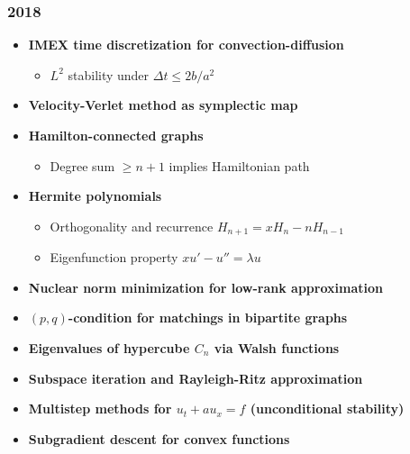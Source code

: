 \subsubsection*{2018}
\begin{itemize}
    \item \textbf{IMEX time discretization for convection-diffusion}
        \begin{itemize}
            \item $L^2$ stability under $\Delta t \leq 2b/a^2$
        \end{itemize}
    \item \textbf{Velocity-Verlet method as symplectic map}
    \item \textbf{Hamilton-connected graphs}
        \begin{itemize}
            \item Degree sum $\geq n+1$ implies Hamiltonian path
        \end{itemize}
    \item \textbf{Hermite polynomials}
        \begin{itemize}
            \item Orthogonality and recurrence $H_{n+1} = xH_n - nH_{n-1}$
            \item Eigenfunction property $xu' - u'' = \lambda u$
        \end{itemize}
    \item \textbf{Nuclear norm minimization for low-rank approximation}
    \item \textbf{$(p,q)$-condition for matchings in bipartite graphs}
    \item \textbf{Eigenvalues of hypercube $C_n$ via Walsh functions}
    \item \textbf{Subspace iteration and Rayleigh-Ritz approximation}
    \item \textbf{Multistep methods for $u_t + au_x = f$ (unconditional stability)}
    \item \textbf{Subgradient descent for convex functions}
\end{itemize}

